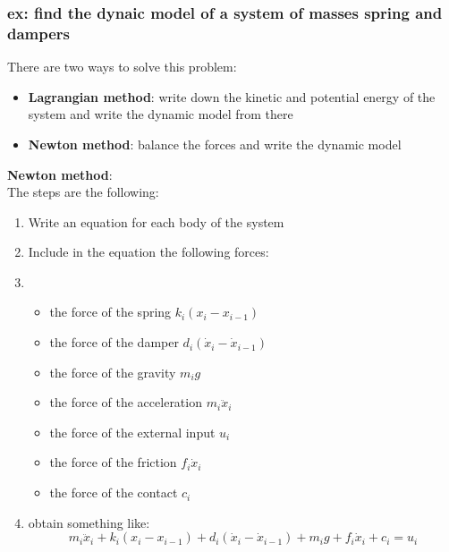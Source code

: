 \documentclass[a4paper,12pt]{article}
\begin{document}
\subsubsection{ex: find the dynaic model of a system of masses
spring and dampers} \label{sec:ex: find the dynaic model of a system of masses}
There are two ways to solve this problem:
\begin{itemize}
    \item \textbf{Lagrangian method}: write down the kinetic
     and potential energy of the system and 
     write the dynamic model from there
    \item \textbf{Newton method}: balance the forces and 
    write the dynamic model
\end{itemize}
\textbf{Newton method}:\\
The steps are the following:
\begin{enumerate}
    \item Write an equation for each body of the system
    \item Include in the equation the following forces:
    \item \begin{itemize}
        \item the force of the spring $k_i(x_i-x_{i-1})$
        \item the force of the damper $d_i(\dot{x}_i-\dot{x}_{i-1})$
        \item the force of the gravity $m_i g$
        \item the force of the acceleration $m_i \ddot{x}_i$
        \item the force of the external input $u_i$
        \item the force of the friction $f_i \dot{x}_i$
        \item the force of the contact $c_i$
    \end{itemize}
    \item obtain something like: \begin{equation}
        m_i \ddot{x}_i + k_i(x_i-x_{i-1}) + d_i(\dot{x}_i-\dot{x}_{i-1}) + m_i g + f_i \dot{x}_i + c_i = u_i
    \end{equation}
\end{enumerate}
\end{document}
